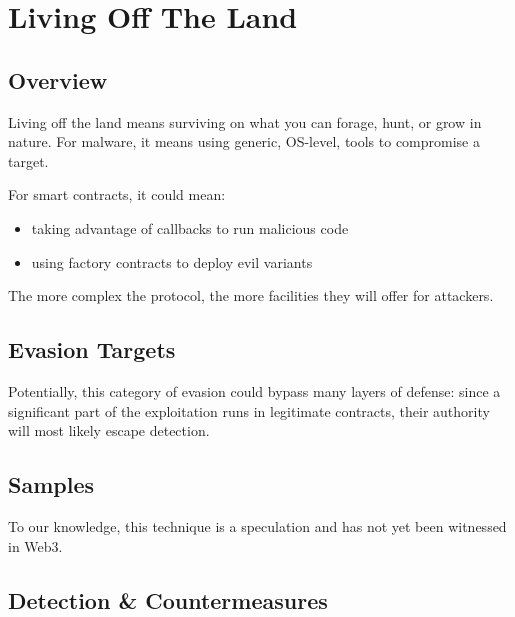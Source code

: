 \section{Living Off The Land} \label{sec:living-off-the-land}

\subsection{Overview}

Living off the land means surviving on what you can forage, hunt, or grow in nature.
For malware, it means using generic, OS-level, tools to compromise a target.

For smart contracts, it could mean:

\begin{itemize}
\item{taking advantage of callbacks to run malicious code}
\item{using factory contracts to deploy evil variants}
\end{itemize}

The more complex the protocol, the more facilities they will offer for attackers.

\subsection{Evasion Targets}

Potentially, this category of evasion could bypass many layers of defense:
since a significant part of the exploitation runs in legitimate contracts, their authority will most likely escape detection.

\subsection{Samples}

To our knowledge, this technique is a speculation and has not yet been witnessed in Web3.

\subsection{Detection \& Countermeasures}
